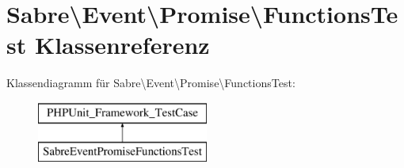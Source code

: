 \hypertarget{class_sabre_1_1_event_1_1_promise_1_1_functions_test}{}\section{Sabre\textbackslash{}Event\textbackslash{}Promise\textbackslash{}Functions\+Test Klassenreferenz}
\label{class_sabre_1_1_event_1_1_promise_1_1_functions_test}
Klassendiagramm für Sabre\textbackslash{}Event\textbackslash{}Promise\textbackslash{}Functions\+Test\+:\begin{figure}[H]
\begin{center}
\leavevmode
\includegraphics[height=2.000000cm]{class_sabre_1_1_event_1_1_promise_1_1_functions_test}
\end{center}
\end{figure}
